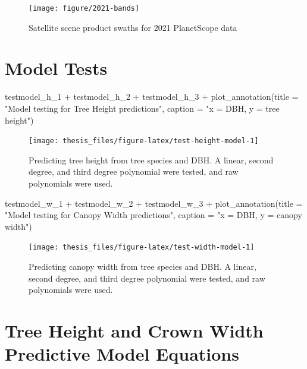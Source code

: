 \documentclass[12pt,twoside]{reedthesis}
\newenvironment{Shaded}{\begin{snugshade}}{\end{snugshade}}
\newcommand{\AttributeTok}[1]{\textcolor[rgb]{0.77,0.63,0.00}{#1}}
\newcommand{\FunctionTok}[1]{\textcolor[rgb]{0.00,0.00,0.00}{#1}}
\newcommand{\NormalTok}[1]{#1}
\newcommand{\SpecialCharTok}[1]{\textcolor[rgb]{0.00,0.00,0.00}{#1}}
\newcommand{\StringTok}[1]{\textcolor[rgb]{0.31,0.60,0.02}{#1}}
\begin{document}
\begin{figure}

{\centering \texttt{[image: figure/2021-bands]} 

}

\caption{Satellite scene product swaths for 2021 PlanetScope data}\label{fig:2021-swath}
\end{figure}
\hypertarget{model-tests}{%
\section{Model Tests}\label{model-tests}}
\begin{Shaded}
\begin{Highlighting}[]
\NormalTok{testmodel\_h\_1 }\SpecialCharTok{+}\NormalTok{ testmodel\_h\_2 }\SpecialCharTok{+}\NormalTok{ testmodel\_h\_3 }\SpecialCharTok{+} \FunctionTok{plot\_annotation}\NormalTok{(}\AttributeTok{title =} \StringTok{"Model testing for Tree Height predictions"}\NormalTok{,}
    \AttributeTok{caption =} \StringTok{"x = DBH, y = tree height"}\NormalTok{)}
\end{Highlighting}
\end{Shaded}
\begin{figure}

{\centering \texttt{[image: thesis\_files/figure-latex/test-height-model-1]} 

}

\caption[Model tests for tree height predictions]{Predicting tree height from tree species and DBH. A linear, second degree, and third degree polynomial were tested, and raw polynomials were used.}\label{fig:test-height-model}
\end{figure}
\begin{Shaded}
\begin{Highlighting}[]
\NormalTok{testmodel\_w\_1 }\SpecialCharTok{+}\NormalTok{ testmodel\_w\_2 }\SpecialCharTok{+}\NormalTok{ testmodel\_w\_3 }\SpecialCharTok{+} \FunctionTok{plot\_annotation}\NormalTok{(}\AttributeTok{title =} \StringTok{"Model testing for Canopy Width predictions"}\NormalTok{,}
    \AttributeTok{caption =} \StringTok{"x = DBH, y = canopy width"}\NormalTok{)}
\end{Highlighting}
\end{Shaded}
\begin{figure}

{\centering \texttt{[image: thesis\_files/figure-latex/test-width-model-1]} 

}

\caption[Model tests for tree canopy width predictions]{Predicting canopy width from tree species and DBH. A linear, second degree, and third degree polynomial were tested, and raw polynomials were used.}\label{fig:test-width-model}
\end{figure}
\hypertarget{tree-model-eqs}{%
\section{Tree Height and Crown Width Predictive Model Equations}\label{tree-model-eqs}}
\end{document}
